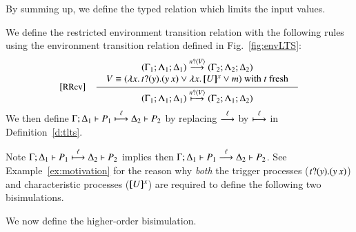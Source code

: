 By summing up, we define the typed relation which limits 
the input values. 

\begin{definition}
\label{def:rlts}
We define the restricted environment transition relation with the following 
rules using the environment transition relation defined in 
Fig.~\ref{fig:envLTS}: 
\[
\begin{array}{rl}
		\eltsrule{RRcv}&\tree {
\begin{array}{c}
(\Gamma_1; \Lambda_1; \Delta_1) \by{\bactinp{n}{V}} (\Gamma_2; \Lambda_2; \Delta_2)
\\
			\begin{array}{lll}
				 V  \scong
(\abs{{x}}{\binp{t}{y} (\appl{y}{{x}})}
 \vee  \abs{{x}}{\map{U}^{{x}}}  \vee m)  \textrm{ with } t \textrm{ fresh} 
			\end{array}
			\end{array}
		}{
			(\Gamma_1; \Lambda_1; \Delta_1) \hby{\bactinp{n}{V}} (\Gamma_2; \Lambda_1; \Delta_2)
		}
\end{array}
\]
We then define 
$\Gamma; \Delta_1 \vdash P_1 \stackrel{\ell}{\longmapsto} \Delta_2 \vdash P_2$
by replacing $\stackrel{\ell}{\longrightarrow}$ by $\stackrel{\ell}{\longmapsto}$ in Definition~\ref{d:tlts}. 
\end{definition}

\smallskip 

\noi Note 
$\Gamma; \Delta_1 \vdash P_1 \stackrel{\ell}{\longmapsto} \Delta_2 \vdash P_2$ implies  
	then $\Gamma; \Delta_1 \vdash P_1 \stackrel{\ell}{\longrightarrow} \Delta_2 \vdash P_2$.
See Example~\ref{ex:motivation} for the reason why {\em both} 
the trigger processes ($t ? (y) . (y\, {{x}})$) 
and characteristic processes ($[\!\![U]\!\!]^{{x}}$) are required 
to define the following two bisimulations. 

\smallskip 

 We now define 
the higher-order bisimulation. 

\smallskip 

